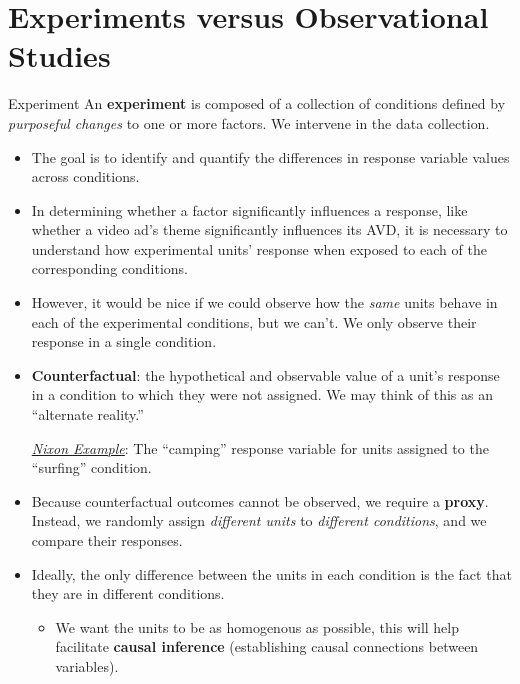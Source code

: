 \section{Experiments versus Observational Studies}
\begin{Definition}{Experiment}{}
    An \textbf{experiment} is composed of a collection of conditions defined by
    \emph{purposeful changes} to one or more factors. We intervene in the data collection.
\end{Definition}
\begin{itemize}
    \item The goal is to identify and quantify the differences in response variable values
          across conditions.
    \item In determining whether a factor significantly influences a response,
          like whether a video ad's theme significantly influences its AVD, it is
          necessary to understand how experimental units' response when exposed to each
          of the corresponding conditions.
    \item However, it would be nice if we could observe how the \emph{same} units behave in
          each of the experimental conditions, but we can't. We only observe their response in a
          single condition.
    \item \textbf{Counterfactual}: the hypothetical and observable value of a unit's response
          in a condition to which they were not assigned. We may think of this
          as an ``alternate reality.''
          \begin{Example}{}{}
              \emph{\hyperref[ex:nixon_ex]{Nixon Example}}: The ``camping'' response
              variable for units assigned to the ``surfing'' condition.
          \end{Example}
    \item Because counterfactual outcomes cannot be observed, we require a \textbf{proxy}.
          Instead, we randomly assign \emph{different units} to \emph{different conditions},
          and we compare their responses.
    \item Ideally, the only difference between the units in each condition is the fact that
          they are in different conditions.
          \begin{itemize}
              \item We want the units to be as homogenous as possible, this will help facilitate
                    \textbf{causal inference} (establishing causal connections between variables).

\end{itemize}
\end{itemize}

